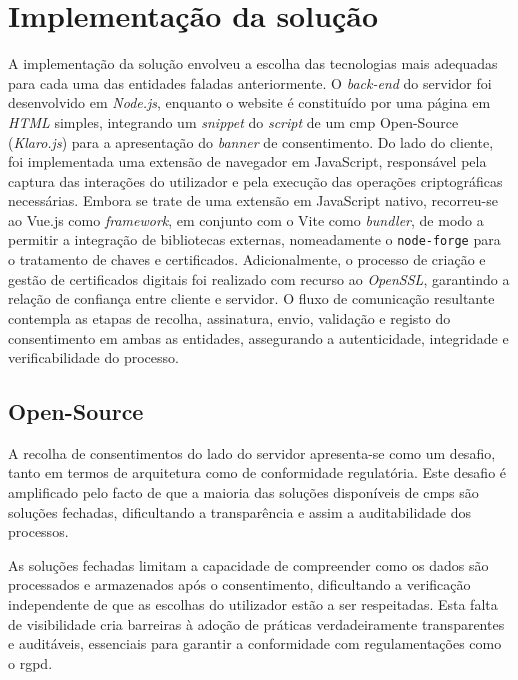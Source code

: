 \chapter{Implementação da solução}
\label{cap:implementacao}

A implementação da solução envolveu a escolha das tecnologias mais adequadas para cada uma das entidades faladas anteriormente. O \textit{back-end} do servidor foi desenvolvido em \textit{Node.js}, enquanto o website é constituído por uma página em \textit{HTML} simples, integrando um \textit{snippet} do \textit{script} de um \acrshort{cmp} Open-Source (\textit{Klaro.js}) para a apresentação do \textit{banner} de consentimento.
Do lado do cliente, foi implementada uma extensão de navegador em JavaScript, responsável pela captura das interações do utilizador e pela execução das operações criptográficas necessárias. Embora se trate de uma extensão em JavaScript nativo, recorreu-se ao Vue.js como \textit{framework}, em conjunto com o Vite como \textit{bundler}, de modo a permitir a integração de bibliotecas externas, nomeadamente o \texttt{node-forge} para o tratamento de chaves e certificados. Adicionalmente, o processo de criação e gestão de certificados digitais foi realizado com recurso ao \textit{OpenSSL}, garantindo a relação de confiança entre cliente e servidor. O fluxo de comunicação resultante contempla as etapas de recolha, assinatura, envio, validação e registo do consentimento em ambas as entidades, assegurando a autenticidade, integridade e verificabilidade do processo.

\section{Open-Source}

A recolha de consentimentos do lado do servidor apresenta-se como um desafio, tanto em termos de arquitetura como de conformidade regulatória. Este desafio é amplificado pelo facto de que a maioria das soluções disponíveis de \acrshort{cmp}s são soluções fechadas, dificultando a transparência e assim a auditabilidade dos processos.

As soluções fechadas limitam a capacidade de compreender como os dados são processados e armazenados após o consentimento, dificultando a verificação independente de que as escolhas do utilizador estão a ser respeitadas. Esta falta de visibilidade cria barreiras à adoção de práticas verdadeiramente transparentes e auditáveis, essenciais para garantir a conformidade com regulamentações como o \acrshort{rgpd}.


